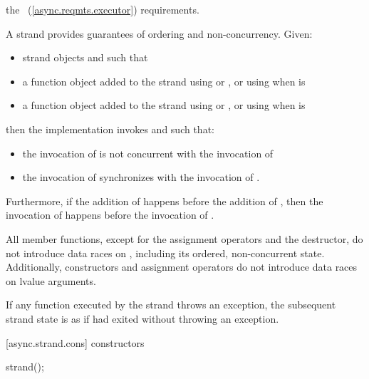 \pnum
{}  the ~(\ref{async.reqmts.executor}) requirements.

\pnum
 A strand provides guarantees of ordering and non-concurrency. Given:

\begin{itemize}
\item
strand objects  and  such that 

\item
a function object  added to the strand  using  or , or using  when  is 

\item
a function object  added to the strand  using  or , or using  when  is 
\end{itemize}

\pnum
then the implementation invokes  and  such that:

\begin{itemize}
\item
the invocation of  is not concurrent with the invocation of 

\item
the invocation of  synchronizes with the invocation of .
\end{itemize}

\pnum
Furthermore, if the addition of  happens before the addition of , then the invocation of  happens before the invocation of .

\pnum
All member functions, except for the assignment operators and the destructor, do not introduce data races on , including its ordered, non-concurrent state. Additionally, constructors and assignment operators do not introduce data races on lvalue arguments.

\pnum
If any function  executed by the strand throws an exception, the subsequent strand state is as if  had exited without throwing an exception.


[async.strand.cons]{ constructors}

%
\begin{itemdecl}
strand();
\end{itemdecl}

